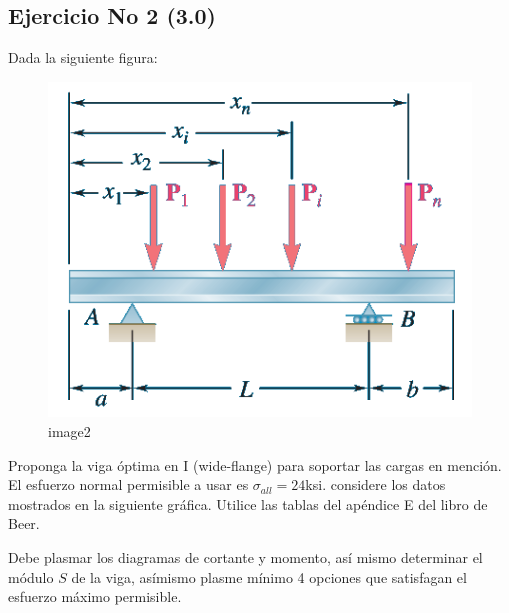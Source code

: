 \documentclass[11pt]{article}
\begin{document}
    \hypertarget{ejercicio-no-2-3.0}{%
\subsection{Ejercicio No 2 (3.0)}\label{ejercicio-no-2-3.0}}

Dada la siguiente figura:

\begin{figure}
\centering
\includegraphics{problem2MoMBending.png}
\caption{image2}
\end{figure}

Proponga la viga óptima en I (wide-flange) para soportar las cargas en
mención. El esfuerzo normal permisible a usar es \(\sigma_{all}=24\)ksi.
considere los datos mostrados en la siguiente gráfica. Utilice las
tablas del apéndice E del libro de Beer.

Debe plasmar los diagramas de cortante y momento, así mismo determinar
el módulo \(S\) de la viga, asímismo plasme mínimo 4 opciones que
satisfagan el esfuerzo máximo permisible.
\end{document}

